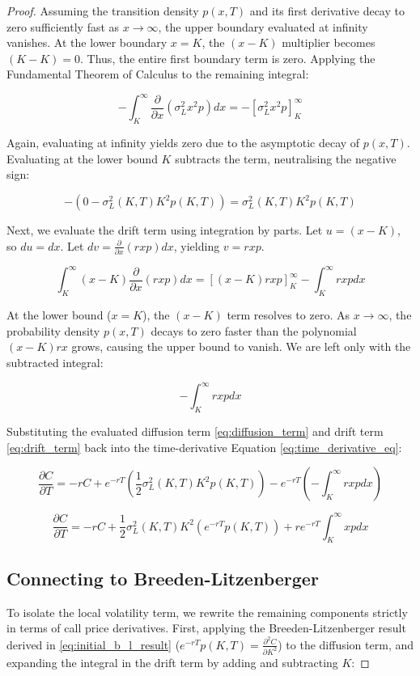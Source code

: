 \documentclass[12pt,oneside]{report}
\theoremstyle{definition}
\theoremstyle{remark}
\begin{document}
\begin{proof}
Assuming the transition density $p(x,T)$ and its first derivative decay to zero sufficiently fast as $x \to \infty$, the upper boundary evaluated at infinity vanishes. At the lower boundary $x=K$, the $(x-K)$ multiplier becomes $(K-K)=0$. Thus, the entire first boundary term is zero. Applying the Fundamental Theorem of Calculus to the remaining integral:

\begin{equation}
- \int_{K}^{\infty} \frac{\partial}{\partial x} \left( \sigma_L^2 x^2 p \right) dx = - \left[ \sigma_L^2 x^2 p \right]_{K}^{\infty}
\label{eq:diffusion_term}
\end{equation}

Again, evaluating at infinity yields zero due to the asymptotic decay of $p(x,T)$. Evaluating at the lower bound $K$ subtracts the term, neutralising the negative sign:

$$-\left( 0 - \sigma_L^2(K, T) K^2 p(K, T) \right) = \sigma_L^2(K, T) K^2 p(K, T)$$

Next, we evaluate the drift term using integration by parts. Let $u = (x - K)$, so $du = dx$. Let $dv = \frac{\partial}{\partial x} (rxp) dx$, yielding $v = rxp$.

$$\int_{K}^{\infty} (x - K) \frac{\partial}{\partial x} (rx p) dx = 
\left[ (x - K) r x p \right]_{K}^{\infty} - \int_{K}^{\infty} rx p dx$$

At the lower bound ($x = K$), the $(x - K)$ term resolves to zero. As $x \to \infty$, the probability density $p(x, T)$ decays to zero faster than the polynomial $(x-K)rx$ grows, causing the upper bound to vanish. We are left only with the subtracted integral:

\begin{equation}
- \int_{K}^{\infty}rxp dx
\label{eq:drift_term}
\end{equation}

Substituting the evaluated diffusion term \ref{eq:diffusion_term} and drift term \ref{eq:drift_term} back into the time-derivative Equation \ref{eq:time_derivative_eq}:

$$\frac{\partial C}{\partial T} = -rC + e^{-rT} \left( \frac{1}{2} \sigma_L^2(K, T) K^2 p(K, T) \right) - e^{-rT} \left( - \int_{K}^{\infty} r x p dx \right)$$

$$\frac{\partial C}{\partial T} = -rC + \frac{1}{2} \sigma_L^2(K, T) K^2 \left( e^{-rT} p(K, T) \right) + r e^{-rT} \int_{K}^{\infty} x p dx$$

\subsection{Connecting to Breeden-Litzenberger}
To isolate the local volatility term, we rewrite the remaining components strictly in terms of call price derivatives. First, applying the Breeden-Litzenberger result derived in \ref{eq:initial_b_l_result} ($e^{-rT} p(K, T) = \frac{\partial^2 C}{\partial K^2}$) to the diffusion term, and expanding the integral in the drift term by adding and subtracting $K$:


\end{proof}
\end{document}
